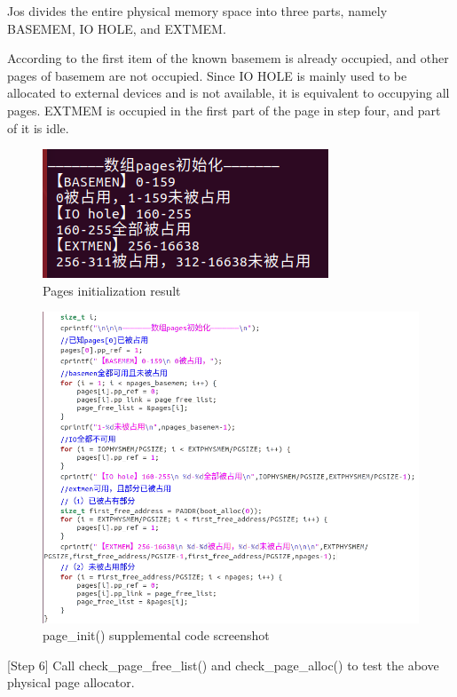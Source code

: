 Jos divides the entire physical memory space into three parts, namely BASEMEM, IO HOLE, and EXTMEM.

According to the first item of the known basemem is already occupied, and other pages of basemem are not occupied. Since IO HOLE is mainly used to be allocated to external devices and is not available, it is equivalent to occupying all pages. EXTMEM is occupied in the first part of the page in step four, and part of it is idle.
\begin{figure}[H]
\centering
\includegraphics[width=0.8\linewidth]{figure/pages_init}
\caption{Pages initialization result}
\end{figure}

\begin{figure}[H]
\centering
\includegraphics[width=0.8\linewidth]{figure/page_init_changed}
\caption{page\_init() supplemental code screenshot}
\end{figure}

[Step 6] Call check\_page\_free\_list() and check\_page\_alloc() to test the above physical page allocator.

